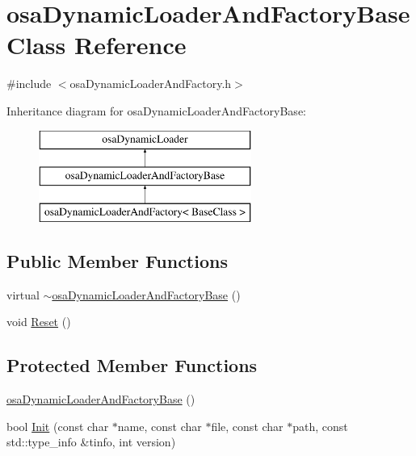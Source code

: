 \hypertarget{classosa_dynamic_loader_and_factory_base}{}\section{osa\+Dynamic\+Loader\+And\+Factory\+Base Class Reference}
\label{classosa_dynamic_loader_and_factory_base}


{\ttfamily \#include $<$osa\+Dynamic\+Loader\+And\+Factory.\+h$>$}

Inheritance diagram for osa\+Dynamic\+Loader\+And\+Factory\+Base\+:\begin{figure}[H]
\begin{center}
\leavevmode
\includegraphics[height=3.000000cm]{d4/db2/classosa_dynamic_loader_and_factory_base}
\end{center}
\end{figure}
\subsection*{Public Member Functions}
\begin{DoxyCompactItemize}
\item 
virtual \hyperlink{classosa_dynamic_loader_and_factory_base_a22f0748faf02fe8ee9ba2517863cd6ac}{$\sim$osa\+Dynamic\+Loader\+And\+Factory\+Base} ()
\item 
void \hyperlink{classosa_dynamic_loader_and_factory_base_a6e219c62db3beacf9a508e78172e405f}{Reset} ()
\end{DoxyCompactItemize}
\subsection*{Protected Member Functions}
\begin{DoxyCompactItemize}
\item 
\hyperlink{classosa_dynamic_loader_and_factory_base_a8b3e608e8f5d2c182deaca5662dead8e}{osa\+Dynamic\+Loader\+And\+Factory\+Base} ()
\item 
bool \hyperlink{classosa_dynamic_loader_and_factory_base_ab0bb3920f795f8fc07f6ace96faef15e}{Init} (const char $\ast$name, const char $\ast$file, const char $\ast$path, const std\+::type\+\_\+info \&tinfo, int version)
\end{DoxyCompactItemize}
